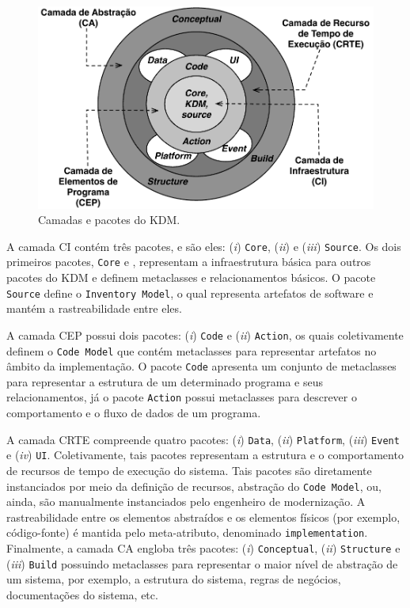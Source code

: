 %
\begin{figure}[htb]
 \caption{Camadas e pacotes do KDM.}
 \label{fig:kdm_layer}
 \centering
 \includegraphics[scale=0.67]{images/kdm_layers.pdf}
\end{figure}
%
A camada CI contém três pacotes, e são eles: (\textit{i}) \texttt{Core}, (\textit{ii}) \texttt{} e (\textit{iii}) \texttt{Source}. Os dois primeiros pacotes, \texttt{Core} e \texttt{}, representam a infraestrutura básica para outros pacotes do KDM e definem metaclasses e relacionamentos básicos. O pacote \texttt{Source} define o \texttt{Inventory Model}, o qual representa artefatos de software e mantém a rastreabilidade entre eles. 

A camada CEP possui dois pacotes: (\textit{i}) \texttt{Code} e (\textit{ii}) \texttt{Action}, os quais coletivamente definem o \texttt{Code Model} que contém metaclasses para representar artefatos no âmbito da implementação. O pacote \texttt{Code} apresenta um conjunto de metaclasses para representar a estrutura de um determinado programa e seus relacionamentos, já o pacote \texttt{Action} possui metaclasses para descrever o comportamento e o fluxo de dados de um programa.

A camada CRTE compreende quatro pacotes: (\textit{i}) \texttt{Data}, (\textit{ii}) \texttt{Platform}, (\textit{iii}) \texttt{Event} e (\textit{iv}) \texttt{UI}. Coletivamente, tais pacotes representam a estrutura e o comportamento de recursos de tempo de execução do sistema. Tais pacotes são diretamente instanciados por meio da definição de recursos, abstração do \texttt{Code Model}, ou, ainda, são manualmente instanciados pelo engenheiro de modernização. A rastreabilidade entre os elementos abstraídos e os elementos físicos (por exemplo, código-fonte) é mantida pelo meta-atributo, denominado \texttt{implementation}. Finalmente, a camada CA engloba três pacotes: (\textit{i}) \texttt{Conceptual}, (\textit{ii}) \texttt{Structure} e (\textit{iii}) \texttt{Build} possuindo metaclasses para representar o maior nível de abstração de um sistema, por exemplo, a estrutura do sistema, regras de negócios, documentações do sistema, etc.

